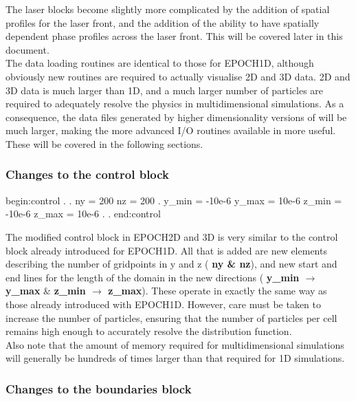 \documentclass[12pt,a4paper]{article}
\newcommand{\inlineemph}[1]{{\color{warwicklight} \bf{#1}}}
\newcommand{\EPOCH}{{\color{warwickdark}\fontfamily{phv}\selectfont{EPOCH}}}
\newenvironment{lboxverbatim}[1]{
\setlength{\FrameSep}{0pt}
\def\FrameCommand{\fboxsep=0pt \colorbox{shadecolor}}
\MakeFramed{\FrameRestore}
\vspace{-13.5pt}
\fvset{label=#1}
\boxverb
}{
\endboxverb
\vspace{-13.5pt}
\endMakeFramed
}
\begin{document}
The laser blocks become slightly more complicated by the addition of spatial
profiles for the laser front, and the addition of the ability to have spatially
dependent phase profiles across the laser front. This will be covered later in
this document.\\

The data loading routines are identical to those for EPOCH1D, although
obviously new routines are required to actually visualise 2D and 3D data. 2D
and 3D data is much larger than 1D, and a much larger number of particles are
required to adequately resolve the physics in multidimensional simulations. As
a consequence, the data files generated by higher dimensionality versions of
{\EPOCH} will be much larger, making the more advanced I/O routines available
in {\EPOCH} more useful. These will be covered in the following sections.\\

\subsubsection{Changes to the \inlineemph{control} block}

\begin{lboxverbatim}{Changed control block}
begin:control
   .
   .
   ny = 200
   nz = 200
   .
   y_min = -10e-6
   y_max = 10e-6
   z_min = -10e-6
   z_max = 10e-6
   .
   .
end:control
\end{lboxverbatim}

The modified control block in EPOCH2D and 3D is very similar to the control
block already introduced for EPOCH1D. All that is added are new elements
describing the number of gridpoints in y and z (\inlineemph{ny \& nz}), and
new start and end lines for the length of the domain in the new directions
(\inlineemph{y\_min $\rightarrow$ y\_max} \&
\inlineemph{z\_min $\rightarrow$ z\_max}). These operate in exactly the same
way as those already introduced with EPOCH1D.  However, care must be taken to
increase the number of particles, ensuring that the number of particles per
cell remains high enough to accurately resolve the distribution function.\\

Also note that the amount of memory required for multidimensional simulations
will generally be hundreds of times larger than that required for 1D
simulations.\\

\subsubsection{Changes to the \inlineemph{boundaries} block}
\end{document}

